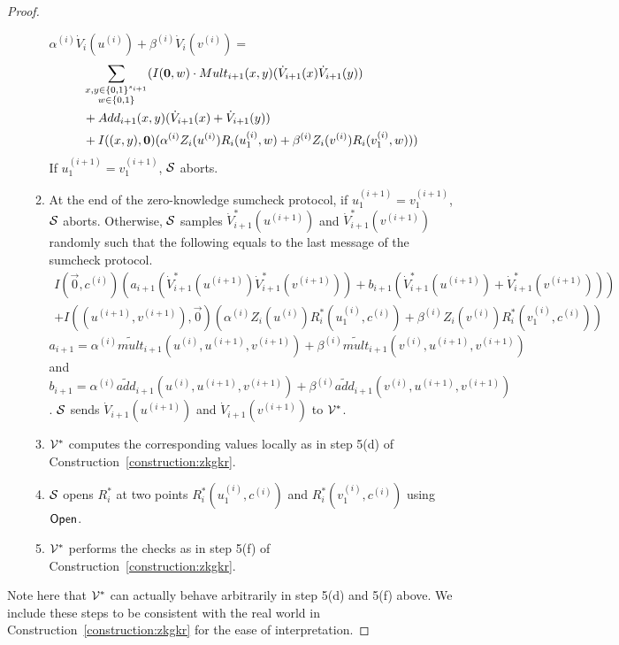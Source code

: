 \begin{proof}
\begin{enumerate}
\begin{enumerate}
	$\alpha^{(i)}\dot{V}_i(u^{(i)})+\beta^{(i)}\dot{V}_i(v^{(i)})=$
	\begin{align*}
	&\sum_{\substack{x, y\in \binary^{s_{i+1}}\\w \in \binary}}(I(\vec{0},w) \cdot Mult_{i+1}(x, y)(\dot{V}_{i+1}(x)\dot{V}_{i+1}(y))\\
	&+Add_{i+1}(x, y)(\dot{V}_{i+1}(x)+\dot{V}_{i+1}(y))\nonumber\\
	&+ I((x, y), \vec{0})(\alpha^{(i)}Z_i(u^{(i)})R_i(u_1^{(i)}, w)+\beta^{(i)}Z_i(v^{(i)})R_i(v_1^{(i)}, w)))
	\end{align*}
	If $u_1^{(i+1)} = v_1^{(i+1)}$, $\S$ aborts.
	
	\item At the end of the zero-knowledge sumcheck protocol, if $u_1^{(i+1)} = v_1^{(i+1)}$, $\S$ aborts. Otherwise, $\S$ samples $\dot{V}^*_{i+1}(u^{(i+1)})$ and $\dot{V}^*_{i+1}(v^{(i+1)})$ randomly such that the following equals to the last message of the sumcheck protocol.
	{\footnotesize
	\begin{align*}
	I(\vec{0},c^{(i)})(a_{i+1}(\dot{V}^*_{i+1}(u^{(i+1)})\dot{V}^*_{i+1}(v^{(i+1)}))+b_{i+1}(\dot{V}^*_{i+1}(u^{(i+1)})+\dot{V}^*_{i+1}(v^{(i+1)})))\\
	+I((u^{(i+1)},v^{(i+1)}),\vec{0})(\alpha^{(i)}Z_i(u^{(i)})R^*_i(u_1^{(i)}, c^{(i)})+\beta^{(i)}Z_i(v^{(i)})R^*_i(v_1^{(i)}, c^{(i)}))
	\end{align*}
	}
	$a_{i+1} = \alpha^{(i)}\tilde{mult}_{i+1}(u^{(i)}, u^{(i+1)}, v^{(i+1)})+\beta^{(i)}\tilde{mult}_{i+1}(v^{(i)}, u^{(i+1)}, v^{(i+1)})$ and $b_{i+1} = \alpha^{(i)}\tilde{add}_{i+1}(u^{(i)}, u^{(i+1)}, v^{(i+1)})+\beta^{(i)}\tilde{add}_{i+1}(v^{(i)}, u^{(i+1)}, v^{(i+1)})$. $\S$ sends $\dot{V}_{i+1}(u^{(i+1)})$ and $\dot{V}_{i+1}(v^{(i+1)})$ to $\V^*$.
	
	\item $\V^*$ computes the corresponding values locally as in step 5(d) of Construction~\ref{construction:zkgkr}.
	\item $\S$ opens $R^*_i$ at two points $R^*_i(u_1^{(i)},c^{(i)})$ and $R^*_i(v_1^{(i)},c^{(i)})$ using $\Open$.
	\item $\V^*$ performs the checks as in step 5(f) of Construction~\ref{construction:zkgkr}.
	\end{enumerate}
\end{enumerate} 

Note here that $\V^*$ can actually behave arbitrarily in step 5(d) and 5(f) above. We include these steps to be consistent with the real world in  Construction~\ref{construction:zkgkr} for the ease of interpretation.


\end{proof}
